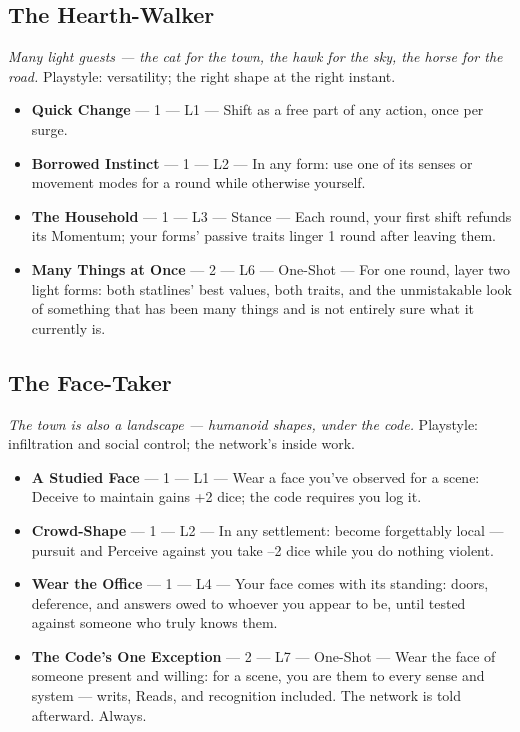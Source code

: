 \subsection{The Hearth-Walker}
\textit{Many light guests --- the cat for the town, the hawk for the sky, the horse for the road.} Playstyle: versatility; the right shape at the right instant.
\begin{itemize}
    \item \textbf{Quick Change} --- 1 --- L1 --- Shift as a free part of any action, once per surge.
    \item \textbf{Borrowed Instinct} --- 1 --- L2 --- In any form: use one of its senses or movement modes for a round while otherwise yourself.
    \item \textbf{The Household} --- 1 --- L3 --- Stance --- Each round, your first shift refunds its Momentum; your forms' passive traits linger 1 round after leaving them.
    \item \textbf{Many Things at Once} --- 2 --- L6 --- One-Shot --- For one round, layer two light forms: both statlines' best values, both traits, and the unmistakable look of something that has been many things and is not entirely sure what it currently is.
\end{itemize}

\subsection{The Face-Taker}
\textit{The town is also a landscape --- humanoid shapes, under the code.} Playstyle: infiltration and social control; the network's inside work.
\begin{itemize}
    \item \textbf{A Studied Face} --- 1 --- L1 --- Wear a face you've observed for a scene: Deceive to maintain gains +2 dice; the code requires you log it.
    \item \textbf{Crowd-Shape} --- 1 --- L2 --- In any settlement: become forgettably local --- pursuit and Perceive against you take --2 dice while you do nothing violent.
    \item \textbf{Wear the Office} --- 1 --- L4 --- Your face comes with its standing: doors, deference, and answers owed to whoever you appear to be, until tested against someone who truly knows them.
    \item \textbf{The Code's One Exception} --- 2 --- L7 --- One-Shot --- Wear the face of someone present and willing: for a scene, you are them to every sense and system --- writs, Reads, and recognition included. The network is told afterward. Always.
\end{itemize}

